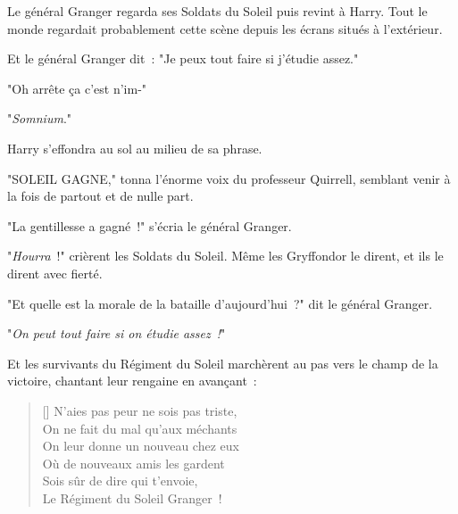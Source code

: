 Le général Granger regarda ses Soldats du Soleil puis revint à Harry. Tout le monde regardait probablement cette scène depuis les écrans situés à l'extérieur.

Et le général Granger dit~: "Je peux tout faire si j'étudie assez."

"Oh arrête ça c'est n'im-"

"\emph{Somnium}."

Harry s'effondra au sol au milieu de sa phrase.

"SOLEIL GAGNE," tonna l'énorme voix du professeur Quirrell, semblant venir à la fois de partout et de nulle part.

"La gentillesse a gagné~!" s'écria le général Granger.

"\emph{Hourra}~!" crièrent les Soldats du Soleil. Même les Gryffondor le dirent, et ils le dirent avec fierté.

"Et quelle est la morale de la bataille d'aujourd'hui~?" dit le général Granger.

"\emph{On peut tout faire si on étudie assez~!}"

Et les survivants du Régiment du Soleil marchèrent au pas vers le champ de la victoire, chantant leur rengaine en avançant~:

\begin{verse}[\versewidth]
N'aies pas peur ne sois pas triste,\\
On ne fait du mal qu'aux méchants\\
On leur donne un nouveau chez eux\\
Où de nouveaux amis les gardent\\
Sois sûr de dire qui t'envoie,\\
Le Régiment du Soleil Granger~!
\end{verse}

